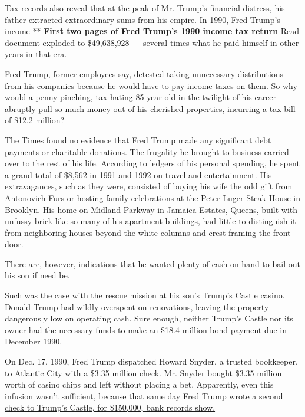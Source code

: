 Tax records also reveal that at the peak of Mr. Trump's financial
distress, his father extracted extraordinary sums from his empire. In
1990, Fred Trump's income ** \textbf{First two pages of Fred Trump's
1990 income tax return}
\href{https://int.graylady3jvrrxbe.onion/data/documenthelper/192-fct-1040-1990/f3b877329915ee2c4602/optimized/full.pdf\#page=1}{Read
document} exploded to \$49,638,928 --- several times what he paid
himself in other years in that era.

Fred Trump, former employees say, detested taking unnecessary
distributions from his companies because he would have to pay income
taxes on them. So why would a penny-pinching, tax-hating 85-year-old in
the twilight of his career abruptly pull so much money out of his
cherished properties, incurring a tax bill of \$12.2 million?

The Times found no evidence that Fred Trump made any significant debt
payments or charitable donations. The frugality he brought to business
carried over to the rest of his life. According to ledgers of his
personal spending, he spent a grand total of \$8,562 in 1991 and 1992 on
travel and entertainment. His extravagances, such as they were,
consisted of buying his wife the odd gift from Antonovich Furs or
hosting family celebrations at the Peter Luger Steak House in Brooklyn.
His home on Midland Parkway in Jamaica Estates, Queens, built with
unfussy brick like so many of his apartment buildings, had little to
distinguish it from neighboring houses beyond the white columns and
crest framing the front door.

There are, however, indications that he wanted plenty of cash on hand to
bail out his son if need be.

Such was the case with the rescue mission at his son's Trump's Castle
casino. Donald Trump had wildly overspent on renovations, leaving the
property dangerously low on operating cash. Sure enough, neither Trump's
Castle nor its owner had the necessary funds to make an \$18.4 million
bond payment due in December 1990.

On Dec. 17, 1990, Fred Trump dispatched Howard Snyder, a trusted
bookkeeper, to Atlantic City with a \$3.35 million check. Mr. Snyder
bought \$3.35 million worth of casino chips and left without placing a
bet. Apparently, even this infusion wasn't sufficient, because that same
day Fred Trump wrote
\href{https://int.graylady3jvrrxbe.onion/data/documenthelper/344-trumps-castle-statement/2ed81084d70858cfbb17/optimized/full.pdf\#page=1}{a
second check to Trump's Castle, for \$150,000, bank records show.}

